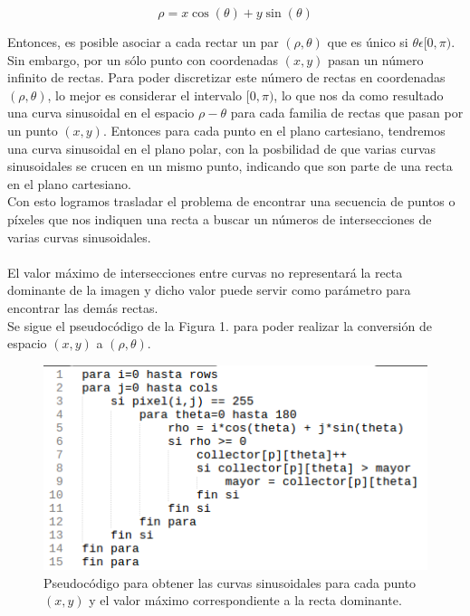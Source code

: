 \documentclass[conference]{IEEEtran}
\begin{document}
\begin{equation}
	\rho = x\cos(\theta) + y\sin(\theta)
\end{equation}

Entonces, es posible asociar a cada rectar un par $(\rho,\theta)$ que es \'unico si $\theta \epsilon [0,\pi)$.\\
Sin embargo, por un s\'olo punto con coordenadas $(x,y)$ pasan un n\'umero infinito de rectas. Para poder discretizar este n\'umero de rectas en coordenadas $(\rho,\theta)$, lo mejor es considerar el intervalo $[0,\pi)$, lo que nos da como resultado una curva sinusoidal en el espacio $\rho-\theta$ para cada familia de rectas que pasan por un punto $(x,y)$. Entonces para cada punto en el plano cartesiano, tendremos una curva sinusoidal en el plano polar, con la posbilidad de que varias curvas sinusoidales se crucen en un mismo punto, indicando que son parte de una recta en el plano cartesiano.\\
Con esto logramos trasladar el problema de encontrar una secuencia de puntos o p\'ixeles que nos indiquen una recta a buscar un n\'umeros de intersecciones de varias curvas sinusoidales.\\\\
El valor m\'aximo de intersecciones entre curvas no representar\'a la recta dominante de la imagen y dicho valor puede servir como par\'ametro para encontrar las dem\'as rectas.\\

Se sigue el pseudoc\'odigo de la Figura 1. para poder realizar la conversi\'on de espacio $(x,y)$ a $(\rho,\theta)$.

\begin{figure}[h]
	\setlength{\unitlength}{0.105in}
	\includegraphics[scale=0.50]{./images/pseudo.png}
	\caption{ Pseudoc\'odigo para obtener las curvas sinusoidales para cada punto $(x,y)$ y el valor m\'aximo correspondiente 
			  a la recta dominante. }
\end{figure}
\end{document}
